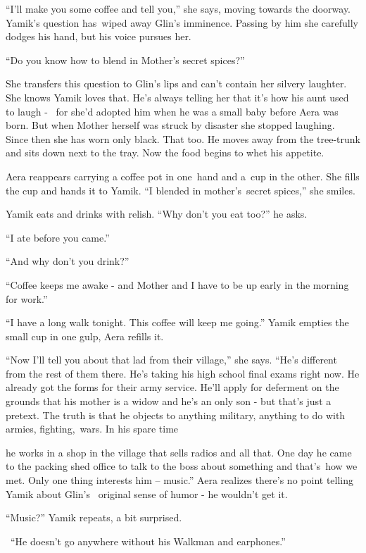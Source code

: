 \documentclass[letterpaper]{article}
\begin{document}
{}``I'll make you some coffee and tell you,'' she says, moving towards the doorway. Yamik's question has~wiped away
Glin's {imminence}. Passing by him she carefully dodges his hand, but his voice pursues her. 

{}``Do you know how to blend in Mother's secret spices?'' 

She transfers this question to Glin's lips and can't contain her silvery laughter. She knows Yamik loves that. He's
always telling her that it's how his aunt used to laugh - \ for she'd adopted him when he was a small baby before Aera
was born. But when Mother herself was struck by disaster she stopped laughing. Since then she has worn only black. That
too. He moves away from the tree-trunk and sits down next to the tray. Now the food begins to whet his appetite. 

Aera reappears carrying a coffee pot in one~hand and a~cup in the other. She fills the cup and hands it to Yamik. ``I
blended in mother's~secret spices,'' she smiles.~ 

Yamik eats and drinks with relish. ``Why don't you eat too?'' he asks. 

{}``I ate before you came.'' 

{}``And why don't you drink?'' 

{}``Coffee keeps me awake - and Mother and I have to be up early in the morning for work.'' 

{}``I have a long walk tonight. This coffee will keep me going.'' Yamik empties the small cup in one gulp, Aera refills
it. 

{}``Now I'll tell you about that lad from their village,'' she says. ``He's different from the rest of them there. He's
taking his high school final exams right now. He already got the forms for their army service. He'll apply for
deferment on the grounds that his mother is a widow and he's an only son - but that's just a pretext. The truth is that
he objects to anything military, anything to do with armies, fighting,~wars. In his spare time 

he works in a shop in the village that sells radios and all that. One day he came to the packing shed office to talk to
the boss about something and that's~how we met. Only one thing interests him -- music.'' Aera realizes there's no point
telling Yamik about Glin's {\ }original{ }sense of humor - he wouldn't get it. 

{}``Music?'' Yamik repeats, a bit surprised.

~``He doesn't go anywhere without his Walkman and earphones.'' 
\end{document}
